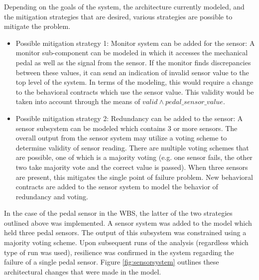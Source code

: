 Depending on the goals of the system, the architecture currently modeled, and the mitigation strategies that are desired, various strategies are possible to mitigate the problem.

\begin{itemize}
\item Possible mitigation strategy 1: Monitor system can be added for the sensor: A monitor sub-component can be modeled in which it accesses the mechanical pedal as well as the signal from the sensor. If the monitor finds discrepancies between these values, it can send an indication of invalid sensor value to the top level of the system. In terms of the modeling, this would require a change to the behavioral contracts which use the sensor value. This validity would be taken into account through the means of $valid \land pedal\_sensor\_value$. 

\item Possible mitigation strategy 2: Redundancy can be added to the sensor: A sensor subsystem can be modeled which contains 3 or more sensors. The overall output from the sensor system may utilize a voting scheme to determine validity of sensor reading. There are multiple voting schemes that are possible, one of which is a majority voting (e.g. one sensor fails, the other two take majority vote and the correct value is passed). 
When three sensors are present, this mitigates the single point of failure problem. New behavioral contracts are added to the sensor system to model the behavior of redundancy and voting. 
\end{itemize}

In the case of the pedal sensor in the WBS, the latter of the two strategies outlined above was implemented. A sensor system was added to the model which held three pedal sensors. The output of this subsystem was constrained using a majority voting scheme. Upon subsequent runs of the analysis (regardless which type of run was used), resilience was confirmed in the system regarding the failure of a single pedal sensor. Figure \ref{fig:sensorsystem} outlines these architectural changes that were made in the model.


